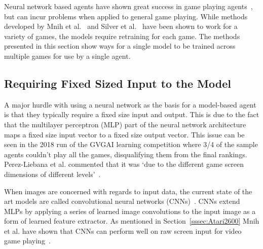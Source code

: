 Neural network based agents have shown great success in game playing agents~\cite{alphaGo, alphaGoZero, alphaZero, OpenAIFive, GVGAIGym, DeepAtari, OpenAIInternational, alphastarblog}, but can incur problems when applied to general game playing.
While methods developed by Mnih et al.~\cite{DeepAtari} and Silver et al.~\cite{alphaZero} have been shown to work for a variety of games, the models require retraining for each game.
The methods presented in this section show ways for a single model to be trained across multiple games for use by a single agent.

\subsection{Requiring Fixed Sized Input to the Model}
\label{ssec:fixedInput}
A major hurdle with using a neural network as the basis for a model-based agent is that they typically require a fixed size input and output.
This is due to the fact that the multilayer perceptron (MLP) part of the neural network architecture maps a fixed size input vector to a fixed size output vector.
This issue can be seen in the 2018 run of the GVGAI learning competition where 3/4 of the sample agents couldn't play all the games, disqualifying them from the final rankings.
Perez-Liebana et al. commented that it was `due to the different game screen dimensions of different levels'~\cite{GVGAI19}.
\par
When images are concerned with regards to input data, the current state of the art models are called convolutional neural networks (CNNs)~\cite{LeCun}.
CNNs extend MLPs by applying a series of learned image convolutions to the input image as a form of learned feature extractor.
As mentioned in Section~\ref{sssec:Atari2600} Mnih et al. have shown that CNNs can perform well on raw screen input for video game playing~\cite{DeepAtari}.


